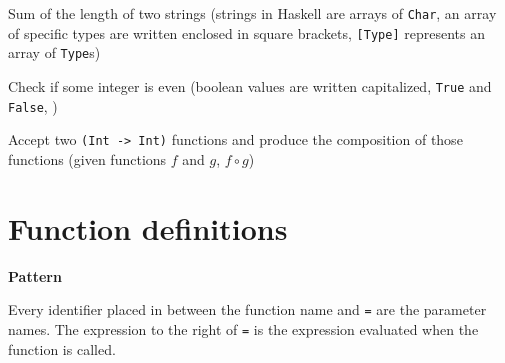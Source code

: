 Sum of the length of two strings (strings in Haskell are arrays of
\texttt{Char}, an array of specific types are written enclosed in square
brackets, \texttt{{[}Type{]}} represents an array of \texttt{Type}s)

\begin{Shaded}
\begin{Highlighting}[]
\NormalTok{ [}\NormalTok{] }\OtherTok{{-}\textgreater{}}\NormalTok{ [}\NormalTok{] }\OtherTok{{-}\textgreater{}} 
\end{Highlighting}
\end{Shaded}

Check if some integer is even (boolean values are written capitalized,
\texttt{True} and \texttt{False}, )

\begin{Shaded}
\begin{Highlighting}[]
  \OtherTok{{-}\textgreater{}} 
\end{Highlighting}
\end{Shaded}

Accept two \texttt{(Int\ -\textgreater{}\ Int)} functions and produce
the composition of those functions (given functions \(f\) and \(g\),
\(f \circ g\))

\begin{Shaded}
\begin{Highlighting}[]
\NormalTok{ (} \OtherTok{{-}\textgreater{}} \NormalTok{) }\OtherTok{{-}\textgreater{}}\NormalTok{ (} \OtherTok{{-}\textgreater{}} \NormalTok{) }\OtherTok{{-}\textgreater{}}\NormalTok{ (} \OtherTok{{-}\textgreater{}} \NormalTok{)}
\end{Highlighting}
\end{Shaded}

\section{Function
definitions}\label{haskell-cheat-sheet.md__function-definitions}

\textbf{Pattern}

Every identifier placed in between the function name and \texttt{=} are
the parameter names. The expression to the right of \texttt{=} is the
expression evaluated when the function is called.

